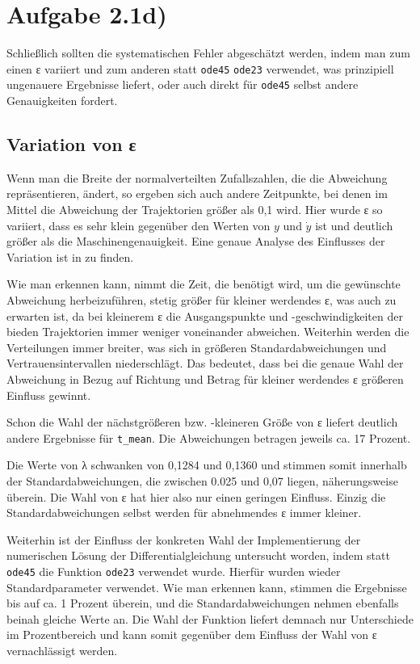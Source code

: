 \section*{Aufgabe 2.1d)}
Schließlich sollten die systematischen Fehler abgeschätzt werden, indem man zum
einen ε variiert und zum anderen statt \texttt{ode45} \texttt{ode23} verwendet,
was prinzipiell ungenauere Ergebnisse liefert, oder auch direkt für
\texttt{ode45} selbst andere Genauigkeiten fordert.

\subsection*{Variation von ε}
Wenn man die Breite der normalverteilten Zufallszahlen, die die Abweichung
repräsentieren, ändert, so ergeben sich auch andere Zeitpunkte, bei denen im 
Mittel die Abweichung der Trajektorien größer als 0,1 wird. Hier wurde ε so
variiert, dass es sehr klein gegenüber den Werten von $y$ und $\dot{y}$ ist und
deutlich größer als die Maschinengenauigkeit. Eine genaue Analyse des Einflusses 
der Variation ist in  zu finden.



Wie man erkennen kann, nimmt die Zeit, die benötigt wird, um die gewünschte 
Abweichung herbeizuführen, stetig größer für kleiner werdendes ε, was auch zu
erwarten ist, da bei kleinerem ε die Ausgangspunkte und -geschwindigkeiten der
bieden Trajektorien immer weniger voneinander abweichen. Weiterhin werden die 
Verteilungen immer breiter, was sich in größeren Standardabweichungen und
Vertrauensintervallen niederschlägt. Das bedeutet, dass bei die genaue Wahl der
Abweichung in Bezug auf Richtung und Betrag für kleiner werdendes ε größeren
Einfluss gewinnt.

Schon die Wahl der nächstgrößeren bzw. -kleineren Größe von ε liefert deutlich
andere Ergebnisse für \texttt{t\_mean}. Die Abweichungen betragen jeweils ca.
17 Prozent. 

Die Werte von λ schwanken von 0,1284 und 0,1360 und stimmen somit innerhalb der
Standardabweichungen, die zwischen 0.025 und 0,07 liegen, näherungsweise überein.
Die Wahl von ε hat hier also nur einen geringen Einfluss. Einzig die
Standardabweichungen selbst werden für abnehmendes ε immer kleiner.

Weiterhin ist der Einfluss der konkreten Wahl der Implementierung der numerischen
Lösung der Differentialgleichung untersucht worden, indem statt \texttt{ode45}
die Funktion \texttt{ode23} verwendet wurde. Hierfür wurden wieder 
Standardparameter verwendet. Wie man erkennen kann, stimmen die Ergebnisse bis
auf ca. 1 Prozent überein, und die Standardabweichungen nehmen ebenfalls beinah
gleiche Werte an. Die Wahl der Funktion liefert demnach nur Unterschiede im 
Prozentbereich und kann somit gegenüber dem Einfluss der Wahl von ε
vernachlässigt werden.


